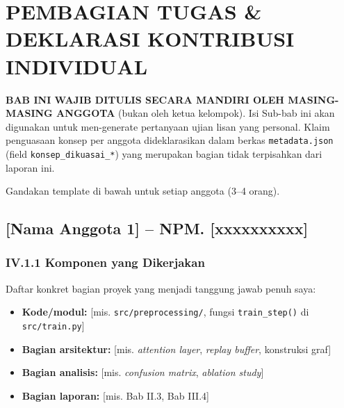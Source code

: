 \documentclass[11pt,a4paper,oneside]{report}
\begin{document}
\chapter{PEMBAGIAN TUGAS \& DEKLARASI KONTRIBUSI INDIVIDUAL}
\label{bab:kontribusi}

\begin{petunjuk}
\textbf{BAB INI WAJIB DITULIS SECARA MANDIRI OLEH MASING-MASING ANGGOTA} (bukan oleh ketua kelompok). Isi Sub-bab ini akan digunakan untuk men-generate pertanyaan ujian lisan yang personal. Klaim penguasaan konsep per anggota dideklarasikan dalam berkas \texttt{metadata.json} (field \texttt{konsep\_dikuasai\_*}) yang merupakan bagian tidak terpisahkan dari laporan ini.

Gandakan template di bawah untuk setiap anggota (3--4 orang).
\end{petunjuk}

\section{[Nama Anggota 1] -- NPM. [xxxxxxxxxx]}

\subsection*{IV.1.1 Komponen yang Dikerjakan}
Daftar konkret bagian proyek yang menjadi tanggung jawab penuh saya:
\begin{itemize}[leftmargin=*]
    \item \textbf{Kode/modul:} [mis. \texttt{src/preprocessing/}, fungsi \texttt{train\_step()} di \texttt{src/train.py}]
    \item \textbf{Bagian arsitektur:} [mis. \textit{attention layer}, \textit{replay buffer}, konstruksi graf]
    \item \textbf{Bagian analisis:} [mis. \textit{confusion matrix}, \textit{ablation study}]
    \item \textbf{Bagian laporan:} [mis. Bab II.3, Bab III.4]
\end{itemize}
\end{document}
